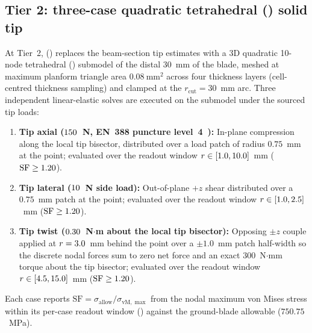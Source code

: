 \subsection{Tier 2: three-case quadratic tetrahedral () solid tip}
At Tier~2,  () replaces the beam-section tip
estimates with a 3D quadratic 10-node tetrahedral () submodel of the distal $30$~mm of the blade, meshed at maximum
planform triangle area $0.08~\mathrm{mm^2}$ across four thickness layers (cell-centred thickness sampling) and clamped at the
$r_\mathrm{cut} = 30$~mm arc. Three independent linear-elastic solves are executed on the submodel under the sourced
 tip loads:
\begin{enumerate}
\item \textbf{Tip axial ($150$~N, EN~388 puncture level~4~\cite{en388}):} In-plane compression along the local tip bisector,
distributed over a load patch of radius $0.75$~mm at the point; evaluated over the readout window
$r \in [1.0, 10.0]$~mm ($\mathrm{SF} \ge 1.20$).
\item \textbf{Tip lateral ($10$~N side load):} Out-of-plane $+z$ shear distributed over a $0.75$~mm patch at the point;
evaluated over the readout window $r \in [1.0, 2.5]$~mm ($\mathrm{SF} \ge 1.20$).
\item \textbf{Tip twist ($0.30$~N$\cdot$m about the local tip bisector):} Opposing $\pm z$ couple applied at
$r = 3.0$~mm behind the point over a $\pm 1.0$~mm patch half-width so the discrete nodal forces sum to zero net
force and an exact $300$~N$\cdot$mm torque about the tip bisector; evaluated over the readout window
$r \in [4.5, 15.0]$~mm ($\mathrm{SF} \ge 1.20$).
\end{enumerate}
Each case reports $\mathrm{SF} = \sigma_\mathrm{allow} / \sigma_{\mathrm{vM},\max}$ from the nodal maximum von Mises stress
within its per-case readout window () against the ground-blade allowable ($750.75$~MPa).
